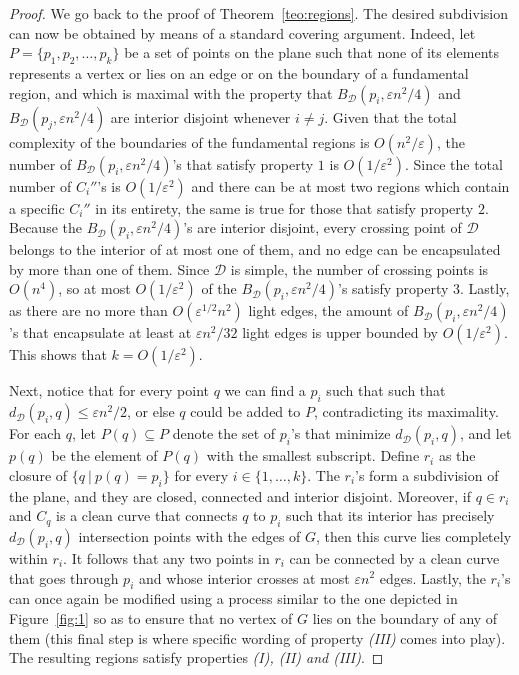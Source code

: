 \documentclass{article}
\begin{document}
\begin{proof}
    We go back to the proof of Theorem~\ref{teo:regions}. The desired subdivision can now be obtained by means of a standard covering argument. Indeed, let $P=\{p_1,p_2,\dots,p_k\}$ be a set of points on the plane such that none of its elements represents a vertex or lies on an edge or on the boundary of a fundamental region, and which is maximal with the property that $B_{\mathcal{D}}(p_i,\varepsilon n^2/4)$ and $B_{\mathcal{D}}(p_j,\varepsilon n^2/4)$ are interior disjoint whenever $i\neq j$. Given that the total complexity of the boundaries of the fundamental regions is $O(n^2/\varepsilon)$, the number of $B_{\mathcal{D}}(p_i,\varepsilon n^2/4)$'s that satisfy property $1$ is $O(1/\varepsilon^2)$. Since the total number of $C_i''$'s is $O(1/\varepsilon^2)$ and there can be at most two regions which contain a specific $C_i''$ in its entirety, the same is true for those that satisfy property $2$. Because the $B_{\mathcal{D}}(p_i,\varepsilon n^2/4)$'s are interior disjoint, every crossing point of $\mathcal{D}$ belongs to the interior of at most one of them, and no edge can be encapsulated by more than one of them. Since $\mathcal{D}$ is simple, the number of crossing points is $O(n^4)$, so at most $O(1/\varepsilon^2)$ of the $B_{\mathcal{D}}(p_i,\varepsilon n^2/4)$'s satisfy property 3. Lastly, as there are no more than $O(\varepsilon^{1/2}n^2)$ light edges, the amount of $B_{\mathcal{D}}(p_i,\varepsilon n^2/4)$'s that encapsulate at least at $\varepsilon n^2/32$ light edges is upper bounded by $O(1/\varepsilon^2)$. This shows that $k=O(1/\varepsilon^2)$. 
    
    Next, notice that for every point $q$ we can find a $p_i$ such that such that $d_\mathcal{D}(p_i,q)\leq\varepsilon n^2/2$, or else $q$ could be added to $P$, contradicting its maximality. For each $q$, let $P(q)\subseteq P$ denote the set of $p_i$'s that minimize $d_\mathcal{D}(p_i,q)$, and let $p(q)$ be the element of $P(q)$ with the smallest subscript. Define $r_i$ as the closure of $\{q\ |\ p(q)=p_i\}$ for every $i\in\{1,\dots,k\}$. The $r_i$'s form a subdivision of the plane, and they are closed, connected and interior disjoint. Moreover, if $q\in r_i$ and $C_q$ is a clean curve that connects $q$ to $p_i$ such that its interior has precisely $d_\mathcal{D}(p_i,q)$ intersection points with the edges of $G$, then this curve lies completely within $r_i$. It follows that any two points in $r_i$ can be connected by a clean curve that goes through $p_i$ and whose interior crosses at most $\varepsilon n^2$ edges. Lastly, the $r_i$'s can once again be modified using a process similar to the one depicted in Figure~\ref{fig:1} so as to ensure that no vertex of $G$ lies on the boundary of any of them (this final step is where specific wording of property \textit{(III)} comes into play). The resulting regions satisfy properties \textit{(I), (II) and (III)}.
    
   
\end{proof}
\end{document}
